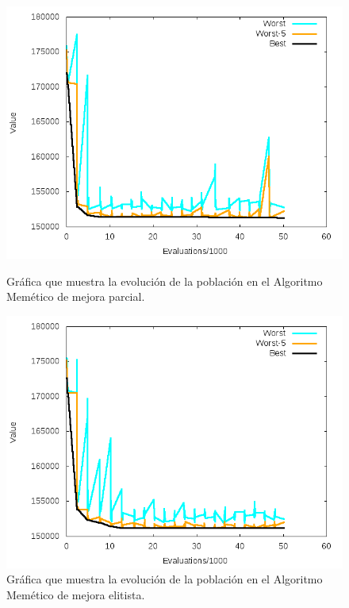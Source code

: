 \documentclass[11pt,a4paper]{article}
\begin{document}
	\begin{figure}[!h]
		\centering
		\begin{minipage}[b]{0.4\textwidth}
			\includegraphics[width=\textwidth]{Plots/AMSub.png}
			\caption{Gráfica que muestra la evolución de la población en el Algoritmo Memético de mejora parcial.}
		\end{minipage}
		\hfill
		\begin{minipage}[b]{0.4\textwidth}
			\includegraphics[width=\textwidth]{Plots/AMElite.png}
			\caption{Gráfica que muestra la evolución de la población en el Algoritmo Memético de mejora elitista.}
		\end{minipage}
	\end{figure}
	
\end{document}
